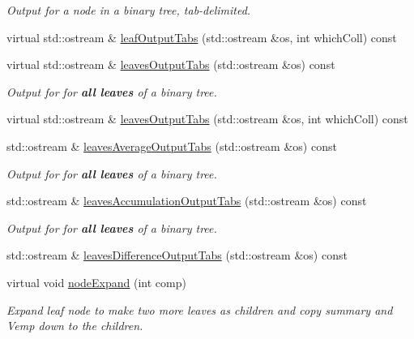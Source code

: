 \begin{DoxyCompactItemize}
\begin{DoxyCompactList}\small\item\em \-Output for a node in a binary tree, tab-\/delimited. \end{DoxyCompactList}\item 
virtual std\-::ostream \& \hyperlink{classsubpavings_1_1CollatorSPVnode_a994d9779baf89f37351656d4d615d340}{leaf\-Output\-Tabs} (std\-::ostream \&os, int which\-Coll) const 
\item 
virtual std\-::ostream \& \hyperlink{classsubpavings_1_1CollatorSPVnode_a214a7d5e78c28dbad8da0753eebe31f4}{leaves\-Output\-Tabs} (std\-::ostream \&os) const 
\begin{DoxyCompactList}\small\item\em \-Output for for {\bfseries all leaves} of a binary tree. \end{DoxyCompactList}\item 
virtual std\-::ostream \& \hyperlink{classsubpavings_1_1CollatorSPVnode_af432d9c3c95ad16f40274a0ab35948b8}{leaves\-Output\-Tabs} (std\-::ostream \&os, int which\-Coll) const 
\item 
std\-::ostream \& \hyperlink{classsubpavings_1_1CollatorSPVnode_ad2fe162c253c15b43027ccd44ce9136b}{leaves\-Average\-Output\-Tabs} (std\-::ostream \&os) const 
\begin{DoxyCompactList}\small\item\em \-Output for for {\bfseries all leaves} of a binary tree. \end{DoxyCompactList}\item 
std\-::ostream \& \hyperlink{classsubpavings_1_1CollatorSPVnode_a74c11c958cf56fbfff724d464c02f03a}{leaves\-Accumulation\-Output\-Tabs} (std\-::ostream \&os) const 
\begin{DoxyCompactList}\small\item\em \-Output for for {\bfseries all leaves} of a binary tree. \end{DoxyCompactList}\item 
std\-::ostream \& \hyperlink{classsubpavings_1_1CollatorSPVnode_a63529191a0b2eb1bc253c5c717fc2965}{leaves\-Difference\-Output\-Tabs} (std\-::ostream \&os) const 
\item 
virtual void \hyperlink{classsubpavings_1_1CollatorSPVnode_ae6555e847a720e43c07ad0c56788f9b6}{node\-Expand} (int comp)
\begin{DoxyCompactList}\small\item\em \-Expand leaf node to make two more leaves as children and copy summary and \-Vemp down to the children. \end{DoxyCompactList}\item 

\end{DoxyCompactItemize}

